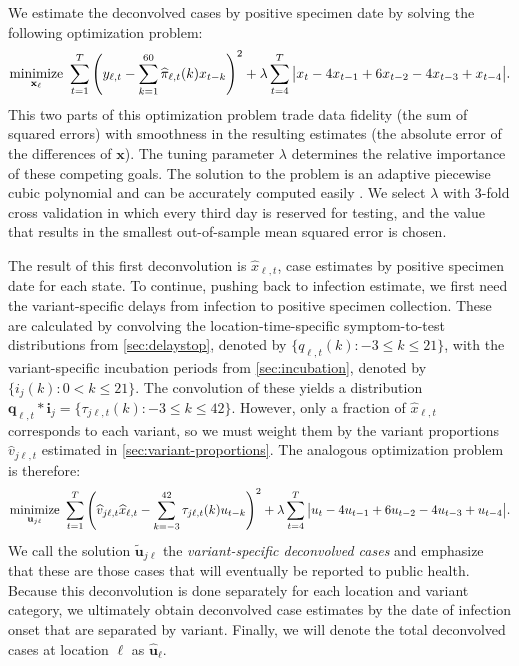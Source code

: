 We estimate the deconvolved cases by positive specimen date by solving the
following optimization problem:
\begin{align}
\operatorname*{minimize}_{\mathbf{x}_\ell}\ \sum_{t=1}^T 
\left( y_{\ell,t} -  \sum_{k=1}^{60}\widehat{\pi}_{\ell,t}(k) x_{t-k} \right)^2 
+ \lambda \sum_{t=4}^T \big|x_t - 4x_{t-1} + 6x_{t-2} -4x_{t-3}+ x_{t-4}\big|.
\end{align}
This two parts of this optimization problem trade data fidelity (the sum of
squared errors) with smoothness in the resulting estimates (the absolute error
of the differences of $\mathbf{x}$). The tuning parameter $\lambda$ determines
the relative importance of these competing goals. The solution to the problem is
an adaptive piecewise cubic polynomial \citep{tibshirani2014adaptive,
tibshirani2022divided} and can be accurately computed easily
\citep{ramdas2016fast}. We select $\lambda$ with $3$-fold cross validation
\citep{jahja2022real} in which every third day is reserved for testing, and the
value that results in the smallest out-of-sample mean squared error is chosen.

The result of this first deconvolution is $\widehat{x}_{\ell,t}$, case estimates
by positive specimen date for each state. To continue, pushing back to infection
estimate, we first need the variant-specific delays from infection to positive
specimen collection. These are calculated by convolving the
location-time-specific symptom-to-test distributions from
\autoref{sec:delaystop}, denoted by $\{q_{\ell,t}(k) : -3\leq k \leq 21\}$, with
the variant-specific incubation periods from \autoref{sec:incubation}, denoted
by $\{i_{j}(k) : 0 < k \leq 21\}$. The convolution of these yields a
distribution $\mathbf{q}_{\ell,t}*\mathbf{i}_j = \{\tau_{j\ell,t}(k): -3 \leq k
\leq 42\}$. However, only a fraction of $\widehat{x}_{\ell,t}$ corresponds to
each variant, so we must weight them by the variant proportions
$\widehat{v}_{j\ell,t}$ estimated in \autoref{sec:variant-proportions}. The
analogous optimization problem is therefore:
\begin{align}
\operatorname*{minimize}_{\mathbf{u}_{j\ell}}\ \sum_{t=1}^T 
\left( 
    \widehat{v}_{j\ell,t}\widehat{x}_{\ell,t} -  
    \sum_{k=-3}^{42} \tau_{j\ell,t}(k) u_{t-k} 
\right)^2 
+ \lambda \sum_{t=4}^T \big|u_{t} - 4u_{t-1} + 6u_{t-2} -4u_{t-3}+ u_{t-4}\big|.
\end{align}
We call the solution $\widetilde{\mathbf{u}}_{j\ell}$ the \emph{variant-specific deconvolved cases} and
emphasize that these are those cases that will eventually be reported to public
health. Because this deconvolution is done separately for each location and
variant category, we ultimately obtain deconvolved case estimates by the date of
infection onset that are separated by variant. Finally, we will denote the total
deconvolved cases at location $\ell$ as $\widehat{\mathbf{u}}_\ell$.

